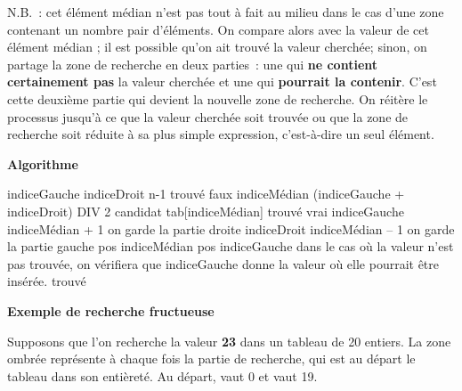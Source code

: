 		{\centering
		\par{}
		}
	
		N.B.~: cet élément médian n'est pas tout à fait au milieu 
		dans le cas d'une zone contenant un nombre pair d'éléments.
		On compare alors  avec la valeur de cet élément médian ; 
		il est possible qu’on ait trouvé la valeur cherchée; 
		sinon, on partage la zone de recherche en deux parties~: 
		une qui \textbf{ne contient certainement pas} la valeur cherchée 
		et une qui \textbf{pourrait la contenir}. 
		C’est cette deuxième partie qui devient la nouvelle zone de recherche. 
		On réitère le processus jusqu’à ce que la valeur cherchée soit trouvée ou
		que la zone de recherche soit réduite à sa plus simple expression,
		c’est-à-dire un seul élément.
	
		{\sffamily\bfseries
		Algorithme}
		
		\begin{LDA}
				\Empty
				\Let indiceGauche 
				\Let indiceDroit \Gets n-1
				\Let trouvé \Gets faux
				\Empty
					\Let indiceMédian \Gets (indiceGauche + indiceDroit) DIV 2
					\Let candidat \Gets tab[indiceMédian]
						\Let trouvé \Gets vrai
						\Let indiceGauche \Gets indiceMédian + 1
						\RComment on garde la partie droite
					\Else
						\Let indiceDroit \Gets indiceMédian – 1
						\RComment on garde la partie gauche
					\EndIf
				\EndWhile
				\Empty
					\Let pos \Gets indiceMédian
				\Else
					\Let pos \Gets indiceGauche
					\RComment dans le cas où la valeur n’est pas trouvée,
					\Empty 
					\RComment on vérifiera que indiceGauche donne la valeur où elle pourrait être insérée.
				\EndIf
				\Empty
				\Return trouvé
			\EndAlgo
		\end{LDA}
		
		{\sffamily\bfseries\upshape
		Exemple de recherche fructueuse}

		Supposons que l’on recherche la valeur \textbf{23} 
		dans un tableau de 20 entiers. 
		La zone ombrée représente à chaque fois la partie de recherche, 
		qui est au départ le tableau dans son entièreté.
		Au départ,
		 vaut 0 et
		 vaut 19.

